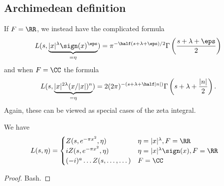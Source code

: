 \subsection{Archimedean definition}
If $F = \RR$, we instead have the complicated formula
\[
  L(s, \underbrace{|x|^\lambda \sign(x)^\eps}_{=\eta} )
  = \pi^{-\half(s+\lambda+\eps)/2} \Gamma\left( \frac{s+\lambda+\eps}{2} \right)
\]
and when $F = \CC$ the formula
\[
  L(s, \underbrace{|x|^{2 \lambda} (x/|x|)^n}_{=\eta} )
  = 2(2\pi)^{-(s+\lambda+\half|n|)} \Gamma\left( s + \lambda + \frac{|n|}{2} \right).
\]
Again, these can be viewed as special cases of the zeta integral.
\begin{proposition}
  We have
  \begin{align*}
    L(s, \eta)
    &= \begin{cases}
      Z(s, e^{-\pi x^2}, \eta) & \eta = |x|^\lambda, F = \RR \\
      i Z(s, e^{-\pi x^2}, \eta) & \eta = |x|^\lambda \sign(x), F = \RR \\
      (-i)^a \dots Z(s, \dots, \dots) & F = \CC
    \end{cases}
  \end{align*}
\end{proposition}
\begin{proof}
  Bash.
\end{proof}

